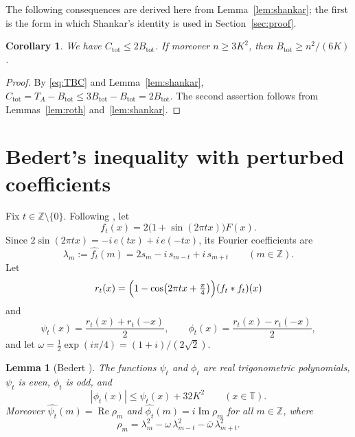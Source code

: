 \documentclass{amsart}
\newtheorem{lemma}[theorem]{Lemma}
\newtheorem{corollary}[theorem]{Corollary}
\theoremstyle{remark}
\numberwithin{equation}{section}
\numberwithin{table}{section}
\newcommand{\T}{\mathbb{T}}
\newcommand{\Z}{\mathbb{Z}}
\newcommand{\Btot}{B_{\mathrm{tot}}}
\newcommand{\Ctot}{C_{\mathrm{tot}}}
\DeclareMathOperator{\re}{Re}
\DeclareMathOperator{\im}{Im}
\begin{document}
The following consequences are derived here from Lemma~\ref{lem:shankar}; the first is the form in which Shankar's identity is used in Section~\ref{sec:proof}.

\begin{corollary}\label{cor:Blower}
We have $\Ctot\le2\Btot$. If moreover $n\ge3K^2$, then $\Btot\ge n^2/(6K)$.
\end{corollary}

\begin{proof}
By \eqref{eq:TBC} and Lemma~\ref{lem:shankar}, $\Ctot=T_A-\Btot\le3\Btot-\Btot=2\Btot$. The second assertion follows from Lemmas~\ref{lem:roth} and~\ref{lem:shankar}.
\end{proof}

\section{Bedert's inequality with perturbed coefficients}\label{sec:bedert}

Fix $t\in\Z\setminus\{0\}$. Following \cite[Section~7]{Bed}, let
\[
f_t(x)=2\bigl(1+\sin(2\pi tx)\bigr)F(x).
\]
Since $2\sin(2\pi tx)=-i\,e(tx)+i\,e(-tx)$, its Fourier coefficients are
\begin{equation}\label{eq:lambda}
\lambda_m:=\widehat{f_t}(m)=2s_m-i\,s_{m-t}+i\,s_{m+t}\qquad(m\in\Z).
\end{equation}
Let
\[
r_t(x)=\Bigl(1-\cos\bigl(2\pi tx+\tfrac\pi4\bigr)\Bigr)(f_t*f_t)(x)
\]
and
\[
\psi_t(x)=\frac{r_t(x)+r_t(-x)}2,\qquad\phi_t(x)=\frac{r_t(x)-r_t(-x)}2,
\]
and let $\omega=\tfrac12\exp(i\pi/4)=(1+i)/(2\sqrt2)$.

\begin{lemma}[Bedert {\cite[Section~7]{Bed}}]\label{lem:bedert}
The functions $\psi_t$ and $\phi_t$ are real trigonometric polynomials, $\psi_t$ is even, $\phi_t$ is odd, and
\begin{equation}\label{eq:phipsi}
|\phi_t(x)|\le\psi_t(x)+32K^2\qquad(x\in\T).
\end{equation}
Moreover $\widehat{\psi_t}(m)=\re\rho_m$ and $\widehat{\phi_t}(m)=i\im\rho_m$ for all $m\in\Z$, where
\begin{equation}\label{eq:rho}
\rho_m=\lambda_m^2-\omega\,\lambda_{m-t}^2-\overline\omega\,\lambda_{m+t}^2.
\end{equation}
\end{lemma}
\end{document}
